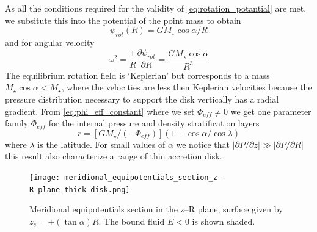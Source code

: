 \documentclass[a4paper,12pt,modern]{aastex62}
\begin{document}
As all the conditions required for the validity of \ref{eq:rotation_potantial} are met, we subsitute this into the potential of the point mass to obtain
\begin{equation}
    \psi_{rot}(R)=GM_\star\cos\alpha/R
\end{equation}
and for angular velocity 
\begin{equation}\label{eq:angular_velocity}
    \omega^2=\frac{1}{R}\frac{\partial \psi_{rot}}{\partial R} = \frac{GM_\star\cos\alpha}{R^3}
\end{equation}
The equilibrium rotation field is `Keplerian' but corresponds to a mass $M_\star\cos\alpha<M_\star$, where the velocities are less then Keplerian velocities because the pressure distribution necessary to support the disk vertically has a radial gradient. From \ref{eq:phi_eff_constant} where we set $\Phi_{eff}\neq0$ we get one parameter family $\Phi_{eff}$ for the internal pressure and density stratification layers
\begin{equation}
    r=\left[ GM_\star/(-\Phi_{eff})\right] \left(1-\cos\alpha/\cos\lambda \right)
\end{equation}
where $\lambda$ is the latitude. 
For small values of $\alpha$ we notice that $|\partial P/\partial z| \gg |\partial P/\partial R|$ this result also characterize a range of thin accretion disk.
\begin{figure}[ht!]
\texttt{[image: meridional\_equipotentials\_section\_z–R\_plane\_thick\_disk.png]}
\caption{Meridional equipotentials section in the z–R plane, surface given
by $z_s=\pm(\tan \alpha)R$. The bound fluid $E < 0$ is shown shaded.}
\label{fig:thick-disk-tori-struct}
\end{figure}
\end{document}
